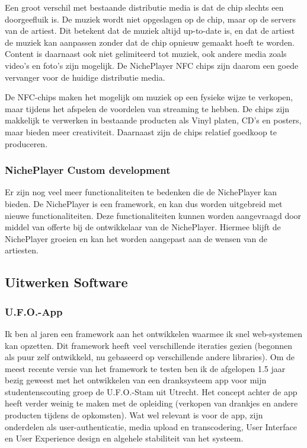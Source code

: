 Een groot verschil met bestaande distributie media is dat de chip slechts een doorgeefluik is. De muziek wordt niet opgeslagen op de chip, maar op de servers van de artiest. Dit betekent dat de muziek altijd up-to-date is, en dat de artiest de muziek kan aanpassen zonder dat de chip opnieuw gemaakt hoeft te worden. Content is daarnaast ook niet gelimiteerd tot muziek, ook andere media zoals video's en foto's zijn mogelijk. De NichePlayer NFC chips zijn daarom een goede vervanger voor de huidige distributie media.

De NFC-chips maken het mogelijk om muziek op een fysieke wijze te verkopen, maar tijdens het afspelen de voordelen van streaming te hebben. De chips zijn makkelijk te verwerken in bestaande producten als Vinyl platen, CD's en posters, maar bieden meer creativiteit. Daarnaast zijn de chips relatief goedkoop te produceren.

\subsubsection*{NichePlayer Custom development}
Er zijn nog veel meer functionaliteiten te bedenken die de NichePlayer kan bieden. De NichePlayer is een framework, en kan dus worden uitgebreid met nieuwe functionaliteiten. Deze functionaliteiten kunnen worden aangevraagd door middel van offerte bij de ontwikkelaar van de NichePlayer. Hiermee blijft de NichePlayer groeien en kan het worden aangepast aan de wensen van de artiesten.

\subsection {Uitwerken Software}
\subsubsection*{U.F.O.-App}
Ik ben al jaren een framework aan het ontwikkelen waarmee ik snel web-systemen kan opzetten. Dit framework heeft veel verschillende iteraties gezien (begonnen als puur zelf ontwikkeld, nu gebaseerd op verschillende andere libraries). Om de meest recente versie van het framework te testen ben ik de afgelopen 1.5 jaar bezig geweest met het ontwikkelen van een dranksysteem app voor mijn studentenscouting groep de U.F.O.-Stam uit Utrecht. Het concept achter de app heeft verder weinig te maken met de opleiding (verkopen van drankjes en andere producten tijdens de opkomsten). Wat wel relevant is voor de app, zijn onderdelen als user-authenticatie, media upload en transcodering, User Interface en User Experience design en algehele stabiliteit van het systeem.

